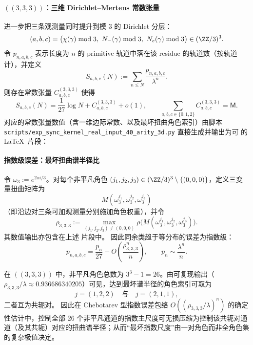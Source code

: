 \paragraph{\texorpdfstring{$((3,3,3))$}{(3,3,3)}：三维 Dirichlet--Mertens 常数张量}
进一步把三条观测量同时提升到模 $3$ 的 Dirichlet 分层：
$$
(a,b,c)=\bigl(\chi(\gamma)\bmod 3,\ N_-(\gamma)\bmod 3,\ N_e(\gamma)\bmod 3\bigr)\in(\ZZ/3)^3.
$$
令 $p_{n,a,b,c}$ 表示长度为 $n$ 的 primitive 轨道中落在该 residue 的轨道数（按轨道计），并定义
$$
S_{a,b,c}(N):=\sum_{n\le N}\frac{p_{n,a,b,c}}{\lambda^n}.
$$
则存在常数张量 $C^{(3,3,3)}_{a,b,c}$ 使得
$$
S_{a,b,c}(N)=\frac{1}{27}\log N + C^{(3,3,3)}_{a,b,c}+o(1),
\qquad
\sum_{a,b,c\in\{0,1,2\}} C^{(3,3,3)}_{a,b,c}=\mathsf{M}.
$$
对应的常数张量数值（含一维边际常数、以及最坏扭曲角色索引）由脚本
\texttt{scripts/exp\_sync\_kernel\_real\_input\_40\_arity\_3d.py}
直接生成并输出为可 \verb|| 的 \LaTeX\ 片段：


\paragraph{指数级误差：最坏扭曲谱半径比}
令 $\omega_3:=e^{2\pi i/3}$。对每个非平凡角色 $(j_1,j_2,j_3)\in(\ZZ/3)^3\setminus\{(0,0,0)\}$，定义三变量扭曲矩阵为
$$
M(\omega_3^{j_1},\omega_3^{j_2},\omega_3^{j_3})
$$
（即沿边对三条可加观测量分别施加角色权重），并令
$$
\rho_{3,3,3}
:=
\max_{(j_1,j_2,j_3)\neq(0,0,0)}
\rho\bigl(M(\omega_3^{j_1},\omega_3^{j_2},\omega_3^{j_3})\bigr).
$$
其数值输出亦包含在上述 \verb|| 片段中。
因此同余类趋于等分布的误差为指数级：
$$
p_{n,a,b,c}=\frac{p_n}{27}+O\!\left(\frac{\rho_{3,3,3}^n}{n}\right),
\qquad
p_n\sim\frac{\lambda^n}{n}.
$$

\begin{remark}\label{rem:arity-333-worst-twist-conjugate-pair}
在 \(((3,3,3))\) 中，非平凡角色总数为 \(3^3-1=26\)。由可复现输出（\(\rho_{3,3,3}/\lambda\approx 0.936686340205\)）可见，达到最坏谱半径的角色索引可取为
\[
j=(1,2,2)\quad\text{与}\quad j=(2,1,1),
\]
二者互为共轭对。
因此在 Chebotarev 型指数误差包络 \(O((\rho_{3,3,3}/\lambda)^n)\) 的确定性估计中，控制全部 \(26\) 个非平凡通道的指数主尺度可无损压缩为控制该共轭对通道（及其共轭）对应的扭曲谱半径；从而“最坏指数尺度”由一对角色而非全角色集的复杂极值决定。
\end{remark}
